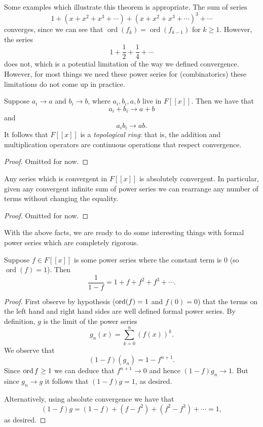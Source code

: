 Some examples which illustrate this theorem is appropriate. The sum of series 
\[1 + (x + x^2 + x^3 + \cdots) + (x + x^2 + x^3 + \cdots)^3 + \cdots\]
converges, since we can see that $\operatorname{ord}(f_k) = \operatorname{ord}(f_{k-1})$ for $k \geq 1$. However, the series 
\[1 + \frac{1}{2} + \frac{1}{4} + \cdots\]
does not, which is a potential limitation of the way we defined convergence. However, for most things we need these power series for (combinatorics) these limitations do not come up in practice.

\begin{theorem}
Suppose $a_i \to a$ and $b_i \to b$, where $a_i, b_i, a, b$ live in $F[[x]]$. Then we have that 
\[a_i + b_i \to a + b\] and \[a_ib_i \to ab.\] It follows that $F[[x]]$ is a \textit{topological ring}: that is, the addition and multiplication operators are continuous operations that respect convergence.
\end{theorem}

\begin{proof}
Omitted for now.
\end{proof}

\begin{theorem}
Any series which is convergent in $F[[x]]$ is absolutely convergent. In particular, given any convergent infinite sum of power series we can rearrange any number of terms without changing the equality.
\end{theorem}

\begin{proof}
Omitted for now.
\end{proof}

With the above facts, we are ready to do some interesting things with formal power series which are completely rigorous.

\begin{theorem}
Suppose $f \in F[[x]]$ is some power series where the constant term is $0$ (so $\operatorname{ord}(f) = 1$). Then 
\[\frac{1}{1-f} = 1 + f + f^2 + f^3 + \cdots.\]
\end{theorem}

\begin{proof}
First observe by hypothesis ($\operatorname{ord}(f) = 1$ and $f(0) = 0$) that the terms on the left hand and right hand sides are well defined formal power series.  By definition, $g$ is the limit of the power series
\[g_n(x) = \sum_{k = 0}^n(f(x))^k.\] We observe that
\[(1-f)(g_n) = 1 - f^{n + 1}.\] Since $\operatorname{ord}{f} \geq 1$ we can deduce that $f^{n + 1} \to 0$ and hence $(1-f)g_n \to 1$. But since $g_n \to g$ it follows that $(1-f)g = 1$, as desired.

Alternatively, using absolute convergence we have that 
\[(1-f)g = (1 - f) + (f - f^2) + (f^2 - f^3) + \cdots = 1,\] as desired.
\end{proof}


